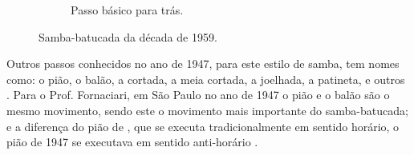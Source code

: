 \begin{itemize}
\begin{figure}[h]
\begin{subfigure}[b]{0.65\textwidth}
        \caption{Passo básico para trás.}
        \label{fig:samba-batucada-basico-tras}
    \end{subfigure}
    \caption{Samba-batucada da década de 1959.}\label{fig:samba-batucada-basico}
\end{figure}

Outros passos conhecidos no ano de 1947, para este estilo de samba, tem nomes como: 
o pião, o balão, a cortada, a meia cortada, a joelhada, a patineta, e outros \cite[pp. 66]{fornaciari1947aprender}.
Para o Prof. Fornaciari, em São Paulo no ano de 1947 o pião e o balão são o mesmo movimento, 
sendo este o movimento mais importante do samba-batucada;
e a diferença do pião de \AnoLivro, que se executa tradicionalmente em sentido horário,
o pião de 1947 se executava em sentido anti-horário \cite[pp. 68,72]{fornaciari1947aprender} 
\cite[pp. 73]{fornaciari1950aprender}.


\end{itemize}
